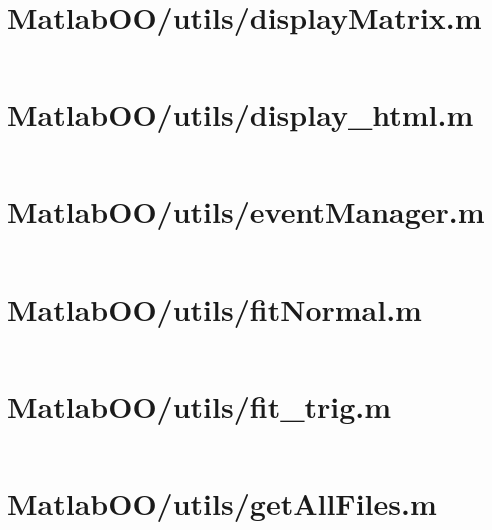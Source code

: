 \pagebreak
\section*{MatlabOO/utils/displayMatrix.m}\label{code:MatlabOO/utils/displayMatrix.m}
\inputminted[linenos,fontsize=\scriptsize]{matlab}{/home/dcouture/git/mathyourlife/TSatPy/beta_versions/matlab_object_oriented/utils/displayMatrix.m}

\pagebreak
\section*{MatlabOO/utils/display\_html.m}\label{code:MatlabOO/utils/display_html.m}
\inputminted[linenos,fontsize=\scriptsize]{matlab}{/home/dcouture/git/mathyourlife/TSatPy/beta_versions/matlab_object_oriented/utils/display_html.m}

\pagebreak
\section*{MatlabOO/utils/eventManager.m}\label{code:MatlabOO/utils/eventManager.m}
\inputminted[linenos,fontsize=\scriptsize]{matlab}{/home/dcouture/git/mathyourlife/TSatPy/beta_versions/matlab_object_oriented/utils/eventManager.m}

\pagebreak
\section*{MatlabOO/utils/fitNormal.m}\label{code:MatlabOO/utils/fitNormal.m}
\inputminted[linenos,fontsize=\scriptsize]{matlab}{/home/dcouture/git/mathyourlife/TSatPy/beta_versions/matlab_object_oriented/utils/fitNormal.m}

\pagebreak
\section*{MatlabOO/utils/fit\_trig.m}\label{code:MatlabOO/utils/fit_trig.m}
\inputminted[linenos,fontsize=\scriptsize]{matlab}{/home/dcouture/git/mathyourlife/TSatPy/beta_versions/matlab_object_oriented/utils/fit_trig.m}

\pagebreak
\section*{MatlabOO/utils/getAllFiles.m}\label{code:MatlabOO/utils/getAllFiles.m}
\inputminted[linenos,fontsize=\scriptsize]{matlab}{/home/dcouture/git/mathyourlife/TSatPy/beta_versions/matlab_object_oriented/utils/getAllFiles.m}

